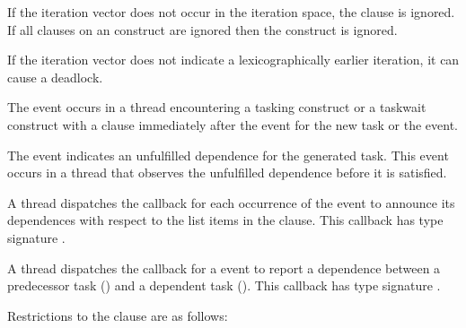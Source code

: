 If the iteration vector  does not occur in the iteration space,
the  clause is ignored.  If all  clauses on an
 construct are ignored then the construct is ignored.

\begin{note}
If the iteration vector  does not indicate a lexicographically earlier iteration, it can cause a deadlock.
\end{note}

\events

The  event occurs in a thread encountering a
tasking construct or a taskwait construct with a  clause immediately after 
the  event for the new task or the  event.

The  event indicates an unfulfilled dependence for the generated task.
This event occurs in a thread that observes the unfulfilled dependence before it is satisfied.

\tools

A thread dispatches the  callback
for each occurrence of the  event to
announce its dependences with respect to the list items in the  clause.
This callback has type signature
.

A thread dispatches the 
callback for a  event to report a
dependence between a predecessor task  () and a dependent task
().  This callback has type signature
.

\restrictions
Restrictions to the  clause are as follows:


